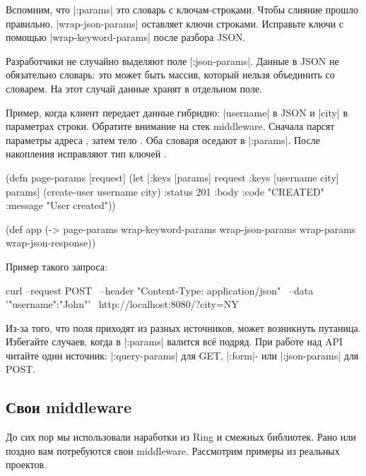 Вспомним, что \spverb|:params| это словарь с ключам-строками. Чтобы слияние
прошло правильно, \spverb|wrap-json-params| оставляет ключи строками. Исправьте
ключи с помощью \spverb|wrap-keyword-params| после разбора JSON.

Разработчики не случайно выделяют поле \spverb|:json-params|. Данные в JSON не
обязательно словарь: это может быть массив, который нельзя объединить со
словарем. На этот случай данные хранят в отдельном поле.

Пример, когда клиент передает данные гибридно: \spverb|username| в JSON и
\spverb|city| в параметрах строки. Обратите внимание на стек middleware. Сначала
парсят параметры адреса , затем тело . Оба словаря
оседают в \spverb|:params|. После накопления исправляют тип ключей .

\begin{english}
  \begin{clojure/lines}
(defn page-params [request]
  (let [{:keys [params]} request
        {:keys [username city]} params]
    (create-user username city)
    {:status 201
     :body {:code "CREATED"
            :message "User created"}}))

(def app (-> page-params
             wrap-keyword-params
             wrap-json-params
             wrap-params
             wrap-json-response))
  \end{clojure/lines}
\end{english}

\noindent
Пример такого запроса:

\begin{english}
  \begin{bash}
curl --request POST \
     --header "Content-Type: application/json" \
     --data '{"username":"John"}' \
     http://localhost:8080/?city=NY
  \end{bash}
\end{english}

Из-за того, что поля приходят из разных источников, может возникнуть
путаница. Избегайте случаев, когда в \spverb|:params| валится вс\"{е} подряд. При
работе над API читайте один источник: \spverb|:query-params| для GET,
\spverb|:form|- или \spverb|:json-params| для POST.

\subsection{Свои middleware}

До сих пор мы использовали наработки из Ring и смежных библиотек. Рано или
поздно вам потребуются свои middleware. Рассмотрим примеры из реальных проектов.

